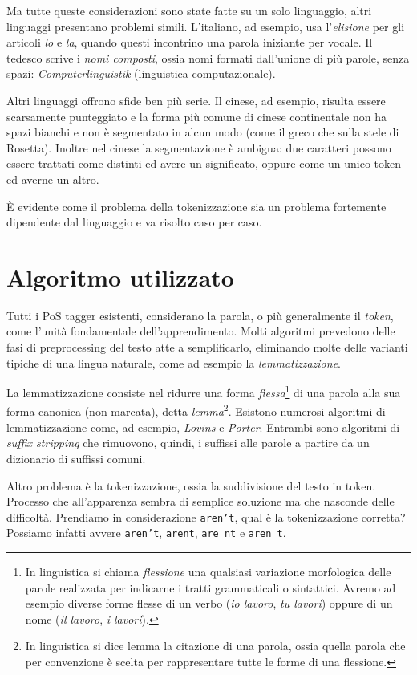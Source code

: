 Ma tutte queste considerazioni sono state fatte su un solo linguaggio, altri linguaggi presentano problemi simili.
L'italiano, ad esempio, usa l'\emph{elisione} per gli articoli \emph{lo} e \emph{la}, quando questi incontrino una parola iniziante per vocale.
Il tedesco scrive i \emph{nomi composti}, ossia nomi formati dall'unione di pi\`u parole, senza spazi: \emph{Computerlinguistik} (linguistica computazionale).

Altri linguaggi offrono sfide ben pi\`u serie.
Il cinese, ad esempio, risulta essere scarsamente punteggiato e la forma pi\`u comune di cinese continentale non ha spazi bianchi e non \`e segmentato in alcun modo (come il greco che sulla stele di Rosetta).
Inoltre nel cinese la segmentazione \`e ambigua: due caratteri possono essere trattati come distinti ed avere un significato, oppure come un unico token ed averne un altro.

\`E evidente come il problema della tokenizzazione sia un problema fortemente dipendente dal linguaggio e va risolto caso per caso.

\section{Algoritmo utilizzato}

Tutti i PoS tagger esistenti, considerano la parola, o pi\`u generalmente il \emph{token}, come l'unit\`a fondamentale dell'apprendimento.
Molti algoritmi prevedono delle fasi di preprocessing del testo atte a semplificarlo, eliminando molte delle varianti tipiche di una lingua naturale, come ad esempio la \emph{lemmatizzazione}.

La lemmatizzazione consiste nel ridurre una forma \emph{flessa}\footnote{In linguistica si chiama \emph{flessione} una qualsiasi variazione morfologica delle parole realizzata per indicarne i tratti grammaticali o sintattici. Avremo ad esempio diverse forme flesse di un verbo (\emph{io lavoro}, \emph{tu lavori}) oppure di un nome (\emph{il lavoro}, \emph{i lavori}).} di una parola alla sua forma canonica (non marcata), detta \emph{lemma}\footnote{In linguistica si dice lemma la citazione di una parola, ossia quella parola che per convenzione è scelta per rappresentare tutte le forme di una flessione.}.
Esistono numerosi algoritmi di lemmatizzazione come, ad esempio, \emph{Lovins} e \emph{Porter}.
Entrambi sono algoritmi di \emph{suffix stripping} che rimuovono, quindi, i suffissi alle parole a partire da un dizionario di suffissi comuni.

Altro problema \`e la tokenizzazione, ossia la suddivisione del testo in token. Processo che all'apparenza sembra di semplice soluzione ma che nasconde delle difficolt\`a.
Prendiamo in considerazione \texttt{aren't}, qual \`e la tokenizzazione corretta? Possiamo infatti avvere \texttt{aren't}, \texttt{arent}, \texttt{are nt} e \texttt{aren t}.

